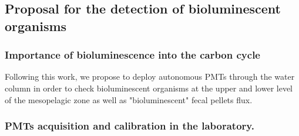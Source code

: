 
\subsection[Proposal for the detection of bioluminescent organisms]{Proposal for the detection of bioluminescent organisms
}


\subsubsection*{Importance of bioluminescence into the carbon cycle}

Following this work, we propose to deploy autonomous PMTs through the water column in order to check bioluminescent organisms at the upper and lower level of the mesopelagic zone as well as "bioluminescent" fecal pellets flux.\\

\subsubsection*{PMTs acquisition and calibration in the laboratory.} 

